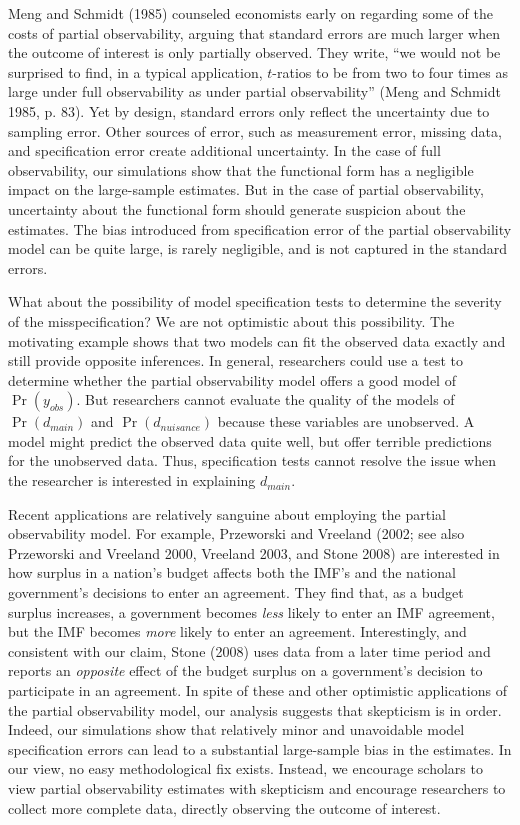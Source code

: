 \documentclass[10pt]{article}
\begin{document}
Meng and Schmidt (1985) counseled economists early on regarding some of the costs of partial observability, arguing that standard errors are much larger when the outcome of interest is only partially observed. 
They write, ``we would not be surprised to find, in a typical application, $t$-ratios to be from two to four times as large under full observability as under partial observability'' (Meng and Schmidt 1985, p. 83). 
Yet by design, standard errors only reflect the uncertainty due to sampling error. 
Other sources of error, such as measurement error, missing data, and specification error create additional uncertainty. 
In the case of full observability, our simulations show that the functional form has a negligible impact on the large-sample estimates. 
But in the case of partial observability, uncertainty about the functional form should generate suspicion about the estimates. 
The bias introduced from specification error of the partial observability model can be quite large, is rarely negligible, and is not captured in the standard errors.

What about the possibility of model specification tests to determine the severity of the misspecification? 
We are not optimistic about this possibility. 
The motivating example shows that two models can fit the observed data exactly and still provide opposite inferences. 
In general, researchers could use a test to determine whether the partial observability model offers a good model of $\Pr(y_{obs})$. 
But researchers cannot evaluate the quality of the models of $\Pr(d_{main})$ and $\Pr(d_{nuisance})$ because these variables are unobserved.
A model might predict the observed data quite well, but offer terrible predictions for the unobserved data.
Thus, specification tests cannot resolve the issue when the researcher is interested in explaining $d_{main}$.

Recent applications are relatively sanguine about employing the partial observability model. 
For example, Przeworski and Vreeland (2002; see also Przeworski and Vreeland 2000, Vreeland 2003, and Stone 2008) are interested in how surplus in a nation's budget affects both the IMF's and the national government's decisions to enter an agreement.
They find that, as a budget surplus increases, a government becomes \textit{less} likely to enter an IMF agreement, but the IMF becomes \textit{more} likely to enter an agreement.
Interestingly, and consistent with our claim, Stone (2008) uses data from a later time period and reports an \textit{opposite} effect of the budget surplus on a government's decision to participate in an agreement.
In spite of these and other optimistic applications of the partial observability model, our analysis suggests that skepticism is in order. 
Indeed, our simulations show that relatively minor and unavoidable model specification errors can lead to a substantial large-sample bias in the estimates. In our view, no easy methodological fix exists. Instead, we encourage scholars to view partial observability estimates with skepticism and encourage researchers to collect more complete data, directly observing the outcome of interest.
\end{document}

